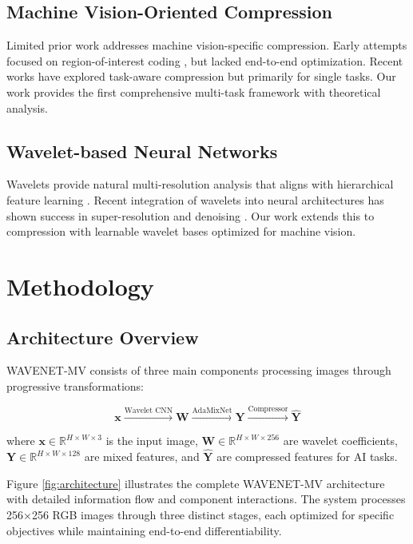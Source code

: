 \documentclass[conference]{IEEEtran}
\begin{document}
\subsection{Machine Vision-Oriented Compression}

Limited prior work addresses machine vision-specific compression. Early attempts focused on region-of-interest coding \cite{christopoulos2000jpeg2000}, but lacked end-to-end optimization. Recent works \cite{choi2022scalable, singh2020end} have explored task-aware compression but primarily for single tasks. Our work provides the first comprehensive multi-task framework with theoretical analysis.

\subsection{Wavelet-based Neural Networks}

Wavelets provide natural multi-resolution analysis that aligns with hierarchical feature learning \cite{liu2018multi, huang2017wavelet}. Recent integration of wavelets into neural architectures has shown success in super-resolution \cite{huang2017wavelet} and denoising \cite{liu2018multi}. Our work extends this to compression with learnable wavelet bases optimized for machine vision.

\section{Methodology}

\subsection{Architecture Overview}

WAVENET-MV consists of three main components processing images through progressive transformations:

\begin{equation}
\mathbf{x} \xrightarrow{\text{Wavelet CNN}} \mathbf{W} \xrightarrow{\text{AdaMixNet}} \mathbf{Y} \xrightarrow{\text{Compressor}} \hat{\mathbf{Y}}
\end{equation}

where $\mathbf{x} \in \mathbb{R}^{H \times W \times 3}$ is the input image, $\mathbf{W} \in \mathbb{R}^{H \times W \times 256}$ are wavelet coefficients, $\mathbf{Y} \in \mathbb{R}^{H \times W \times 128}$ are mixed features, and $\hat{\mathbf{Y}}$ are compressed features for AI tasks.

Figure \ref{fig:architecture} illustrates the complete WAVENET-MV architecture with detailed information flow and component interactions. The system processes 256×256 RGB images through three distinct stages, each optimized for specific objectives while maintaining end-to-end differentiability.
\end{document}
